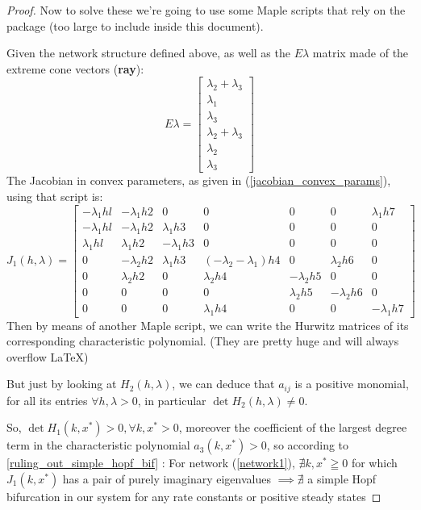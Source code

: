 \begin{proof}
	Now to solve these we're going to use some Maple scripts that rely on the \cite{franz2016ConvexMaple} package (too large to include inside this document).

	Given the network structure defined above, as well as the $E\lambda$ matrix made of the extreme cone vectors (\textbf{ray}):
	\[
		E\lambda =
		\begin{bmatrix}
			\lambda_2 + \lambda_3 \\
			\lambda_1 \\
			\lambda_3 \\
			\lambda_2 + \lambda_3 \\
			\lambda_2 \\
			\lambda_3
		\end{bmatrix}
	\]
	The Jacobian in convex parameters, as given in (\ref{jacobian_convex_params}), using that script is:
	\[
		\left. J_1(h,\lambda)=
		\left[
			\begin{array}{ccccccc}-\lambda_1hl&-\lambda_1h2&0&0&0&0&\lambda_1h7\\-\lambda_1hl&-\lambda_1h2&\lambda_1h3&0&0&0&0\\\lambda_1hl&\lambda_1h2&-\lambda_1h3&0&0&0&0\\0&-\lambda_2h2&\lambda_1h3&(-\lambda_2-\lambda_1)h4&0&\lambda_2h6&0\\0&\lambda_2h2&0&\lambda_2h4&-\lambda_2h5&0&0\\0&0&0&0&\lambda_2h5&-\lambda_2h6&0\\0&0&0&\lambda_1h4&0&0&-\lambda_1h7
		\end{array}\right.\right]
	\]
	Then by means of another Maple script, we can write the Hurwitz matrices of its corresponding characteristic polynomial. (They are pretty huge and will always overflow \LaTeX)

	But just by looking at $H_2(h,\lambda)$, we can deduce that $a_{ij}$ is a positive monomial, for all  its entries $\forall h , \lambda > 0$, in particular $\det H_2(h, \lambda) \neq 0$.

	So, $\det H_1(k,x^*) > 0, \forall k, x^* > 0$, moreover the coefficient of the largest degree term in the characteristic polynomial $a_3(k, x^*) > 0$, so according to \ref{ruling_out_simple_hopf_bif} : For network (\ref{network1}), $\nexists k, x^* \geqq 0$ for which $J_1(k,x^*)$ has a pair of purely imaginary eigenvalues $\implies \nexists$ a simple Hopf bifurcation in our system for any rate constants or positive steady states
\end{proof}

